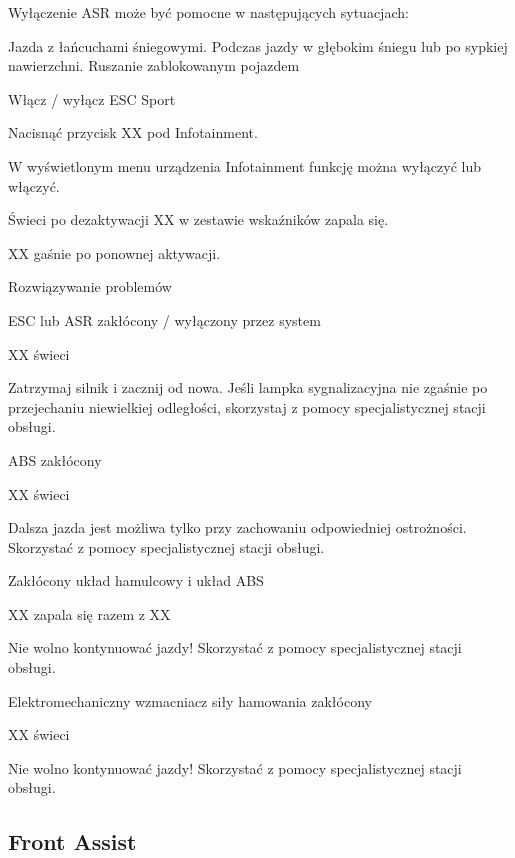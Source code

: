 Wyłączenie ASR może być pomocne w następujących sytuacjach:
\begin{itemizeTriangle}
	\itemTriangle Jazda z łańcuchami śniegowymi.
	\itemTriangle Podczas jazdy w głębokim śniegu lub po sypkiej nawierzchni.
	\itemTriangle Ruszanie zablokowanym pojazdem
\end{itemizeTriangle}

Włącz / wyłącz ESC Sport

\begin{itemizeArrow}
	\itemArrow Nacisnąć przycisk XX pod Infotainment.
\end{itemizeArrow}

W wyświetlonym menu urządzenia Infotainment funkcję można wyłączyć lub włączyć.

Świeci po dezaktywacji XX w zestawie wskaźników zapala się.

XX gaśnie po ponownej aktywacji.

Rozwiązywanie problemów

ESC lub ASR zakłócony / wyłączony przez system

XX świeci
\begin{itemizeArrow}
	\itemArrow Zatrzymaj silnik i zacznij od nowa.
	\itemArrow Jeśli lampka sygnalizacyjna nie zgaśnie po przejechaniu niewielkiej odległości, skorzystaj z pomocy specjalistycznej stacji obsługi.
\end{itemizeArrow}

ABS zakłócony

XX świeci
\begin{itemizeArrow}
	\itemArrow Dalsza jazda jest możliwa tylko przy zachowaniu odpowiedniej ostrożności. Skorzystać z pomocy specjalistycznej stacji obsługi.
\end{itemizeArrow}

Zakłócony układ hamulcowy i układ ABS

XX zapala się razem z XX
\begin{itemizeArrow}
	\itemArrow Nie wolno kontynuować jazdy! Skorzystać z pomocy specjalistycznej stacji obsługi.
\end{itemizeArrow}

Elektromechaniczny wzmacniacz siły hamowania zakłócony

XX świeci
\begin{itemizeArrow}
	\itemArrow Nie wolno kontynuować jazdy! Skorzystać z pomocy specjalistycznej stacji obsługi.
\end{itemizeArrow}

\subsection{Front Assist}

